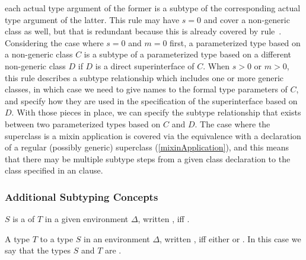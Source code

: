 \documentclass[makeidx]{article}
\begin{document}
{{\begin{itemize}
  each actual type argument of the former is a subtype of
  the corresponding actual type argument of the latter.
  This rule may have $s = 0$ and cover a non-generic class as well,
  but that is redundant because this is already covered by
  rule~\SrnReflexivity.
  Considering the case where $s = 0$ and $m = 0$ first,
  a parameterized type based on a non-generic class $C$ is a subtype of
  a parameterized type based on a different non-generic class $D$ if
  $D$ is a direct superinterface of $C$.
  When $s > 0$ or $m > 0$, this rule describes a subtype relationship
  which includes one or more generic classes,
  in which case we need to give names to the formal type parameters of $C$,
  and specify how they are used in the specification of the superinterface
  based on $D$.
  With those pieces in place, we can specify the subtype relationship
  that exists between two parameterized types based on $C$ and $D$.
  The case where the superclass is a mixin application is covered via
  the equivalence with a declaration of a regular (possibly generic) superclass
  (\ref{mixinApplication}),
  and this means that there may be multiple subtype steps from
  a given class declaration to the class specified in an \EXTENDS{} clause.
\end{itemize}%
}


\subsubsection{Additional Subtyping Concepts}

\LMHash{}%
$S$ is a  of $T$ in a given environment $\Delta$,
written ,
if{}f .

\LMHash{}%
A type $T$
to a type $S$ in an environment $\Delta$,
written ,
if{}f either  or .
In this case we say that the types $S$ and $T$ are
.

}
\end{document}
